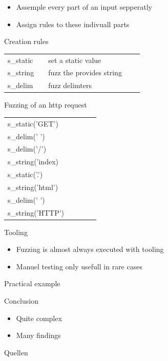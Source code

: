 \documentclass{beamer}
\begin{document}
\begin{frame}
 \begin{itemize}
   \item Assemple every part of an input sepperatly
   \item Assign rules to these indivuall parts
  \end{itemize}
 
\end{frame}
\begin{frame}{Creation rules}
\begin{table}[]
\begin{tabular}{lllll}
s\_static  &  &  set a static value  \\
s\_string  &  &  fuzz the provides string  \\
s\_delim  &  &   fuzz delimters  \\
\end{tabular}
\end{table}
\end{frame}

\begin{frame}{Fuzzing of an http request}
 \begin{center}
 \begin{table}[]
 \begin{tabular}{lllll}
 s\_static('GET')  &  &  &  \\
  s\_delim(' ')\\
 s\_delim('/')\\
    s\_string('index)\\
   s\_static('.')  &  \\
 s\_string('html')\\
 s\_delim(' ')\\
 s\_string('HTTP')&  &  & 
 \end{tabular}
 \end{table}
  
 \end{center}

\end{frame}
\begin{frame}{Tooling}
 \begin{itemize}
  \item Fuzzing is almost always executed with tooling
  \item Manuel testing only usefull in rare cases
 \end{itemize}

\end{frame}


\begin{frame}{Practical example}
 
\end{frame}
\begin{frame}{Conclusion}
 \begin{itemize}
  \item Quite complex
  \item Many findings
 \end{itemize}

\end{frame}
\begin{frame}{Quellen}
 
\end{frame}
\end{document}
